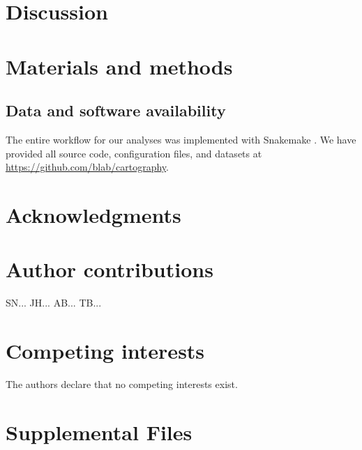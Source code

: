 \documentclass[9pt,lineno]{elife}
\begin{document}
\section*{Discussion}

\section*{Materials and methods}

\subsection*{Data and software availability}

The entire workflow for our analyses was implemented with Snakemake \citep{Snakemake}.
We have provided all source code, configuration files, and datasets at \href{https://github.com/blab/cartography}{https://github.com/blab/cartography}.

\section*{Acknowledgments}

\section*{Author contributions}

SN...
JH...
AB...
TB...

\section*{Competing interests}

The authors declare that no competing interests exist.

\section*{Supplemental Files}


\end{document}
